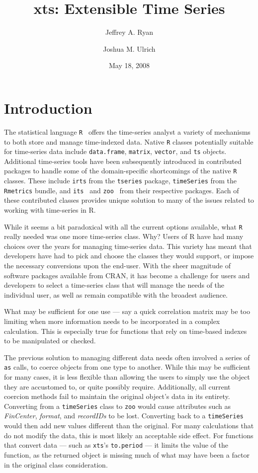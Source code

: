 \documentclass{article}
\title{\bf xts: Extensible Time Series }
\author{Jeffrey A. Ryan \and Joshua M. Ulrich}
\date{May 18, 2008}
\begin{document}
\maketitle
\tableofcontents

\section{Introduction}
The statistical language {\tt R}~\cite{R}
 offers the time-series analyst a variety of mechanisms
to both store and manage time-indexed data.  
Native {\tt R} classes potentially suitable
for time-series data include {\tt data.frame}, {\tt matrix}, {\tt vector}, and
{\tt ts} objects. Additional time-series tools have been subsequently introduced 
in contributed packages to
handle some of the domain-specific shortcomings of the native {\tt R} classes.
These include {\tt irts} from the {\tt tseries} package\cite{tseries},
{\tt timeSeries} from the {\tt Rmetrics} bundle\cite{rmetrics}, and
{\tt its}~\cite{its} and {\tt zoo}~\cite{zoo} from their 
respective packages. Each of these contributed classes provides unique solution
to many of the issues
related to working with time-series in R.

While it seems a bit paradoxical with all the current options
available, what {\tt R} really needed was one more
time-series class.  Why? Users of R have had many choices over the
years for managing time-series data. This variety has meant that
developers have had to pick and choose the classes they would support,
or impose the necessary conversions upon the end-user. With the sheer
magnitude of software packages available from CRAN, it has become a challenge
for users and developers 
to select a time-series class that will manage the needs of the
individual user, as well as remain compatible with the broadest audience.

What may be sufficient for one use --- say a quick correlation matrix may be
too limiting when more information needs to be incorporated 
in a complex calculation.
This is especially true for functions that rely on time-based indexes to
be manipulated or checked.

The previous solution to managing different data needs often
involved a series of {\tt as} calls,
to coerce objects from one type to another.  While this may
be sufficient for many cases, it is less flexible than allowing the users
to simply use the object they are accustomed to, or quite possibly require.
Additionally, all current coercion methods fail to maintain the original
object's data in its entirety.  Converting from a {\tt timeSeries} class to
{\tt zoo} would cause attributes such as 
{\em FinCenter}, {\em format}, and {\em recordIDs} to be lost.
Converting back to a {\tt timeSeries} would then add new
values different than the original.
For many calculations that do not modify the data, this is most likely
an acceptable side effect.  For functions that convert data ---
such as {\tt xts}'s {\tt to.period} --- it limits the value of the function,
as the returned object is missing
much of what may have been a factor in the original class consideration.
\end{document}
